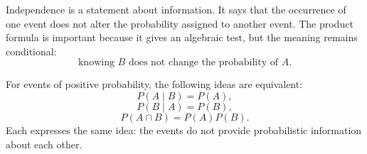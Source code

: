 Independence is a statement about information. It says that the occurrence of
one event does not alter the probability assigned to another event. The product
formula is important because it gives an algebraic test, but the meaning remains
conditional:
\[
\text{knowing }B\text{ does not change the probability of }A.
\]

\begin{theorembox}
For events of positive probability, the following ideas are equivalent:
\[
P(A\mid B)=P(A),
\]
\[
P(B\mid A)=P(B),
\]
\[
P(A\cap B)=P(A)P(B).
\]
Each expresses the same idea: the events do not provide probabilistic
information about each other.
\end{theorembox}
